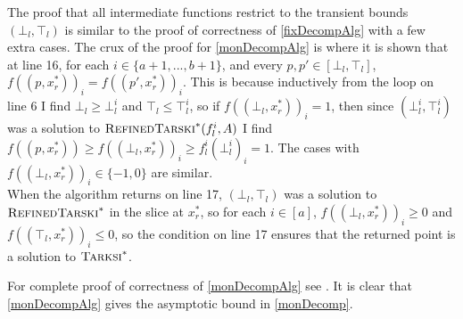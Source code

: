 \begin{sproof}
The proof that all intermediate functions restrict to the transient bounds $(\bot_l, \top_l)$ is similar
to the proof of correctness of \cref{fixDecompAlg} with a few extra cases. 
  The crux of the proof for \cref{monDecompAlg} 
is \citep[Lemma 6]{chenLi}
where it is shown that at line 16, for each $i \in \{a + 1, ..., b + 1\}$, and every $p, p' \in [\bot_l, \top_l]$,
  $f((p, x_r^*))_i = f((p', x_r^*))_i$. This is because inductively from the loop on line 6 I find
$\bot_l \geq \bot_l^i$ and $\top_l \leq \top_l^i$,
  so if $f((\bot_l, x_r^*))_i = 1$, then since $(\bot_l^i, \top_l^i)$ was a solution to
  $\textsc{RefinedTarski}^*(f_l^i, A)$ I find $f((p, x_r^*)) \geq f((\bot_l, x_r^*))_i \geq f_l^i(\bot_l^i)_i = 1$.
  The cases with $f((\bot_l, x_r^*))_i \in \{-1, 0 \}$ are similar. \\
  When the algorithm returns on line 17, $(\bot_l, \top_l)$ was a solution to
  $\textsc{RefinedTarski}^*$ in the slice at $x_r^*$, so for each $i \in [a]$, 
  $f((\bot_l, x_r^*))_i \geq 0$ and $f((\top_l, x_r^*))_i \leq 0$, so the condition on line 17
  ensures that the returned point is a solution to $\textsc{Tarksi}^*$.
\end{sproof}
For complete proof of correctness of \cref{monDecompAlg} see \citep{chenLi}. It is clear that
\cref{monDecompAlg} gives the asymptotic bound in \cref{monDecomp}.
